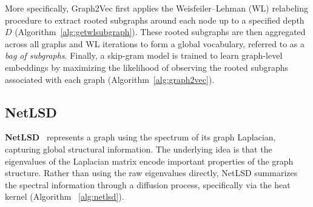 More specifically, Graph2Vec first applies the Weisfeiler--Lehman (WL) relabeling procedure to extract rooted subgraphs around each node up to a specified depth $D$ (Algorithm~\ref{alg:getwlsubgraph}). 
These rooted subgraphs are then aggregated across all graphs and WL iterations to form a global vocabulary, referred to as a \emph{bag of subgraphs}. 
Finally, a skip-gram model is trained to learn graph-level embeddings by maximizing the likelihood of observing the rooted subgraphs associated with each graph (Algorithm~\ref{alg:graph2vec}).

\subsection{NetLSD}
\textbf{NetLSD}~\cite{tsitsulin2018netlsd} represents a graph using the spectrum of its graph Laplacian, 
capturing global structural information. 
The underlying idea is that the eigenvalues of the Laplacian matrix encode important properties 
of the graph structure. 
Rather than using the raw eigenvalues directly, NetLSD summarizes the spectral information 
through a diffusion process, specifically via the heat kernel (Algorithm ~\ref{alg:netlsd}).





